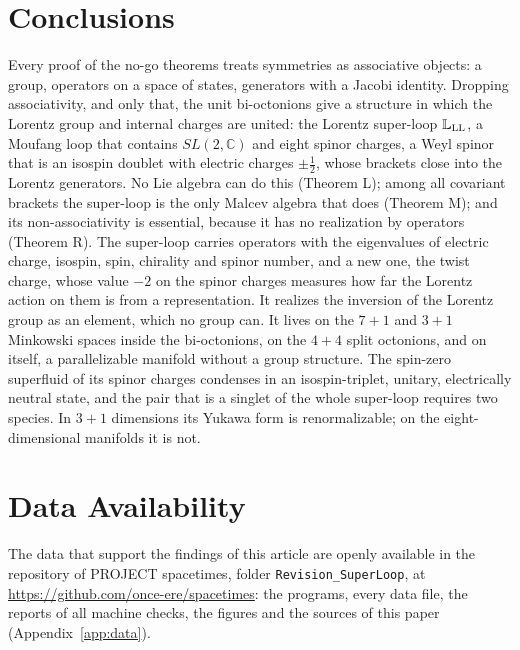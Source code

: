 \section{Conclusions}
\label{sec:conclusions}

Every proof of the no-go theorems treats symmetries as associative objects: a group, operators on a
space of states, generators with a Jacobi identity. Dropping associativity, and only that, the unit
bi-octonions give a structure in which the Lorentz group and internal charges are united: the Lorentz
super-loop $\mathbb L_{\rm LL}$, a Moufang loop that contains $SL(2,\mathbb C)$ and eight spinor charges, a
Weyl spinor that is an isospin doublet with electric charges $\pm\tfrac12$, whose brackets close into
the Lorentz generators. No Lie algebra can do this (Theorem L); among all covariant brackets the
super-loop is the only Malcev algebra that does (Theorem M); and its non-associativity is essential,
because it has no realization by operators (Theorem R). The super-loop carries operators with the
eigenvalues of electric charge, isospin, spin, chirality and spinor number, and a new one, the twist
charge, whose value $-2$ on the spinor charges measures how far the Lorentz action on them is from a
representation. It realizes the inversion of the Lorentz group as an element, which no group can. It
lives on the $7+1$ and $3+1$ Minkowski spaces inside the bi-octonions, on the $4+4$ split octonions, and
on itself, a parallelizable manifold without a group structure. The spin-zero superfluid of its spinor
charges condenses in an isospin-triplet, unitary, electrically neutral state, and the pair that is a
singlet of the whole super-loop requires two species. In $3+1$ dimensions its Yukawa form is
renormalizable; on the eight-dimensional manifolds it is not.

\section*{Data Availability}

The data that support the findings of this article are openly available in the repository of PROJECT
spacetimes, folder \texttt{Revision\_SuperLoop}, at \url{https://github.com/once-ere/spacetimes}: the
programs, every data file, the reports of all machine checks, the figures and the sources of this paper
(Appendix~\ref{app:data}).
